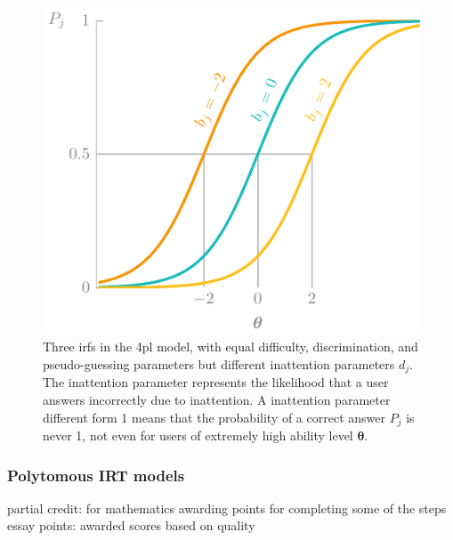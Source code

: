 \begin{figure}
    \centering
    \includegraphics[page=5]{03-education/figures/tikzfigures.pdf}
    \caption[Item response functions of the 4PL model]{Three \glspl{irf} in the \gls{4pl} model, with equal difficulty, discrimination, and pseudo-guessing parameters but different inattention parameters $d_j$. The inattention parameter represents the likelihood that a user answers incorrectly due to inattention. A inattention parameter different form 1 means that the probability of a correct answer $P_j$ is never 1, not even for users of extremely high ability level $\bm\theta$.}
    \label{fig:4pl}
\end{figure}

\subsubsection{Polytomous IRT models}
partial credit: for mathematics awarding points for completing some of the steps
essay points: awarded scores based on quality

